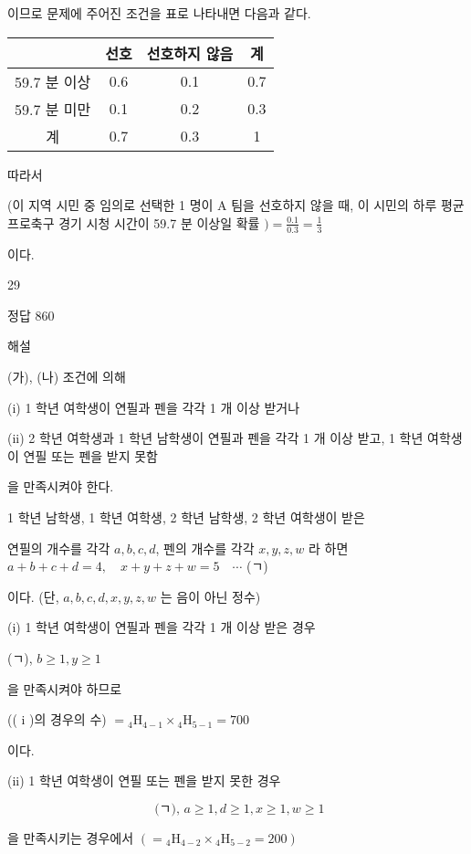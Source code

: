 \documentclass[10pt]{article}
\begin{document}
이므로 문제에 주어진 조건을 표로 나타내면 다음과 같다.

\begin{center}
\begin{tabular}{|c|c|c|c|}
\hline
 & 선호 & 선호하지 않음 & 계 \\
\hline
59.7 분 이상 & 0.6 & 0.1 & 0.7 \\
\hline
59.7 분 미만 & 0.1 & 0.2 & 0.3 \\
\hline
계 & 0.7 & 0.3 & 1 \\
\hline
\end{tabular}
\end{center}

따라서

(이 지역 시민 중 임의로 선택한 1 명이 A 팀을 선호하지 않을 때, 이 시민의 하루 평균 프로축구 경기 시청 시간이 59.7 분 이상일 확률 \()=\frac{0.1}{0.3}=\frac{1}{3}\)

이다.

29

정답 860

해설

(가), (나) 조건에 의해

(i) 1 학년 여학생이 연필과 펜을 각각 1 개 이상 받거나

(ii) 2 학년 여학생과 1 학년 남학생이 연필과 펜을 각각 1 개 이상 받고, 1 학년 여학생이 연필 또는 펜을 받지 못함

을 만족시켜야 한다.

1 학년 남학생, 1 학년 여학생, 2 학년 남학생, 2 학년 여학생이 받은

연필의 개수를 각각 \(a, b, c, d\), 펜의 개수를 각각 \(x, y, z, w\) 라 하면 \(a+b+c+d=4, \quad x+y+z+w=5 \quad \cdots\) (ㄱ)

이다. (단, \(a, b, c, d, x, y, z, w\) 는 음이 아닌 정수)

(i) 1 학년 여학생이 연필과 펜을 각각 1 개 이상 받은 경우

(ㄱ), \(b \geq 1, y \geq 1\)

을 만족시켜야 하므로

(( i )의 경우의 수) \(={ }_{4} \mathrm{H}_{4-1} \times{ }_{4} \mathrm{H}_{5-1}=700\)

이다.

(ii) 1 학년 여학생이 연필 또는 펜을 받지 못한 경우

\[
\text { (ㄱ), } a \geq 1, d \geq 1, x \geq 1, w \geq 1
\]

을 만족시키는 경우에서 \(\left(={ }_{4} \mathrm{H}_{4-2} \times{ }_{4} \mathrm{H}_{5-2}=200\right)\)
\end{document}
